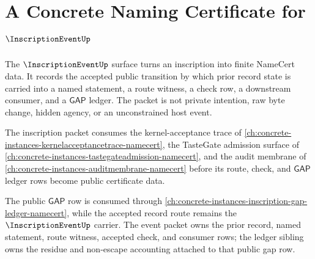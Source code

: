 \chapter{A Concrete Naming Certificate for $\InscriptionEventUp$}
\label{ch:concrete-instances-inscriptionevent-namecert}

The $\InscriptionEventUp$ surface turns an inscription into finite NameCert data. It records the accepted public transition by which prior record state is carried into a named statement, a route witness, a check row, a downstream consumer, and a $\mathsf{GAP}$ ledger. The packet is not private intention, raw byte change, hidden agency, or an unconstrained host event.

The inscription packet consumes the kernel-acceptance trace of \autoref{ch:concrete-instances-kernelacceptancetrace-namecert}, the TasteGate admission surface of \autoref{ch:concrete-instances-tastegateadmission-namecert}, and the audit membrane of \autoref{ch:concrete-instances-auditmembrane-namecert} before its route, check, and $\mathsf{GAP}$ ledger rows become public certificate data.

The public $\mathsf{GAP}$ row is consumed through \autoref{ch:concrete-instances-inscription-gap-ledger-namecert}, while the accepted record route remains the $\InscriptionEventUp$ carrier. The event packet owns the prior record, named statement, route witness, accepted check, and consumer rows; the ledger sibling owns the residue and non-escape accounting attached to that public gap row.

